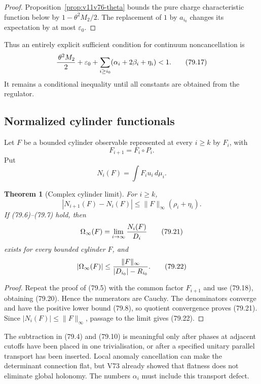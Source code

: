 \documentclass[11pt]{article}
\newtheorem{theorem}{Theorem}[section]
\begin{document}
\begin{proof}
Proposition~\ref{prop:v11v76-theta} bounds the pure charge
characteristic function below by \(1-\theta^2M_2/2\).
The replacement of \(1\) by \(a_{i_0}\) changes its expectation by at
most \(\varepsilon_0\).
\end{proof}

Thus an entirely explicit sufficient condition for continuum
noncancellation is
\[
 {\,\theta^2M_2\over2}+\varepsilon_0
 +\sum_{i\ge i_0}(\alpha_i+2\beta_i+\eta_i)<1.                \tag{79.17}
\]
It remains a conditional inequality until all constants are obtained
from the regulator.

\subsection{Normalized cylinder functionals}

Let \(F\) be a bounded cylinder observable represented at every
\(i\ge k\) by \(F_i\), with
\[
                                  F_{i+1}=F_i\circ P_i.        \tag{79.18}
\]
Put
\[
                                  N_i(F)=\int F_i u_i\,d\mu_i.
                                                                    \tag{79.19}
\]

\begin{theorem}[Complex cylinder limit]
\label{thm:v11v79-cylinder}
For \(i\ge k\),
\[
 |N_{i+1}(F)-N_i(F)|
             \le\|F\|_\infty(\rho_i+\eta_i).                 \tag{79.20}
\]
If (79.6)--(79.7) hold, then
\[
                         \Omega_\infty(F)
            =\lim_{i\to\infty}{N_i(F)\over D_i}              \tag{79.21}
\]
exists for every bounded cylinder \(F\), and
\[
 |\Omega_\infty(F)|
 \le {\|F\|_\infty\over |D_{i_0}|-R_{i_0}}.                  \tag{79.22}
\]
\end{theorem}

\begin{proof}
Repeat the proof of (79.5) with the common factor \(F_{i+1}\) and use
(79.18), obtaining (79.20).  Hence the numerators are Cauchy.
The denominators converge and have the positive lower bound (79.8),
so quotient convergence proves (79.21).  Since
\(|N_i(F)|\le\|F\|_\infty\), passage to the limit gives (79.22).
\end{proof}

\begin{warning}
\label{warn:v11v79-line}
The subtraction in (79.4) and (79.10) is meaningful only after phases
at adjacent cutoffs have been placed in one trivialisation, or after
a specified unitary parallel transport has been inserted.  Local
anomaly cancellation can make the determinant connection flat, but
V73 already showed that flatness does not eliminate global holonomy.
The numbers \(\alpha_i\) must include this transport defect.
\end{warning}
\end{document}
